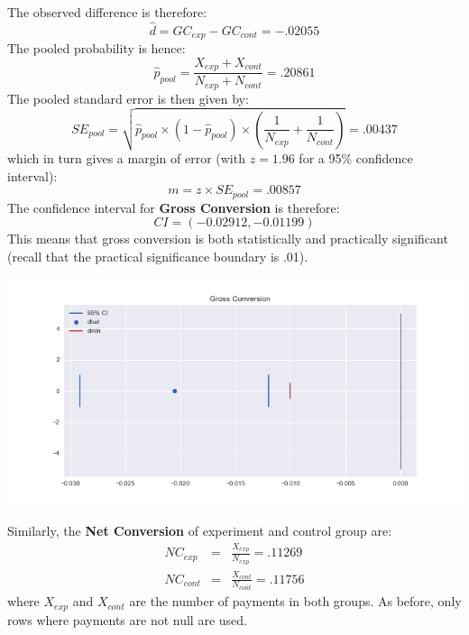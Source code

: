 \documentclass[11pt]{article} %
\begin{document}
The observed difference is therefore:
\begin{equation}
	\hat{d} = GC_{exp} - GC_{cont} = -.02055
\end{equation}
The pooled probability is hence:
\begin{equation}
	\hat{p}_{pool} = \frac{X_{exp}+ X_{cont}}{N_{exp} + N_{cont}} = .20861
\end{equation}
The pooled standard error is then given by:
\begin{equation}
	SE_{pool} = \sqrt{\hat{p}_{pool}\times \left(1-\hat{p}_{pool}\right) \times \left(\frac{1}{N_{exp}} + \frac{1}{N_{cont}}\right)} = .00437
\end{equation}
which in turn gives a margin of error (with $z=1.96$ for a 95\% confidence interval):
\begin{equation}
	m = z \times SE_{pool} = .00857
\end{equation}
The confidence interval for \textbf{Gross Conversion} is therefore:
\begin{equation}
	CI = \left(-0.02912, -0.01199\right)
\end{equation}
This means that gross conversion is both statistically and practically significant (recall that the practical significance boundary is .01).\medskip

\includegraphics[width=\textwidth]{gross_conv}

Similarly, the \textbf{Net Conversion} of experiment and control group are:
\begin{eqnarray}
	NC_{exp} &=& \frac{X_{exp}}{N_{exp}} =  .11269\\
	NC_{cont} &=& \frac{X_{cont}}{N_{cont}}= .11756
\end{eqnarray}
where $X_{exp}$ and $X_{cont}$ are the number of payments in both groups. As before, only rows where payments are not null are used.
\end{document}

